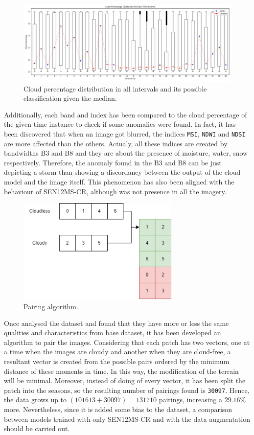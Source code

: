 \begin{figure}[H]
	\centering
	\begin{adjustwidth}{-2cm}{}
		\includegraphics[width=18cm]{imgs/eda/merge/cloud-percentage-each-time-interval}
	\end{adjustwidth}
	\caption{Cloud percentage distribution in all intervals and its possible classification given the median.}
	\label{fig:eda-merge-patch-distribution}
\end{figure}
Additionally, each band and index has been compared to the cloud percentage of the given time instance to check if some anomalies were found. In fact, it has been discovered that when an image got blurred, the indices \texttt{MSI}, \texttt{NDWI} and \texttt{NDSI} are more affected than the others. Actualy, all these indices are created by bandwidths B3 and B8 and they are about the presence of moisture, water, snow respectively. Therefore, the anomaly found in the B3 and B8 can be just depicting a storm than showing a discordancy between the output of the cloud model and the image itself. This phenomenon has also been aligned with the behaviour of SEN12MS-CR, although was not presence in all the imagery.
\begin{figure}[H]
	\centering
	\includegraphics[width=8cm]{imgs/eda/merge/matching}
	\caption{Pairing algorithm.}
	\label{fig:eda-merge-matching}
\end{figure}
Once analysed the dataset and found that they have more or less the same qualities and characteristics from base dataset, it has been developed an algorithm to pair the images. Considering that each patch has two vectors, one at a time when the images are cloudy and another when they are cloud-free, a resultant vector is created from the possible pairs ordered by the minimum distance of these moments in time. In this way, the modification of the terrain will be minimal. Moreover, instead of doing of every vector, it has been split the patch into the seasons, so the resulting number of pairings found is \texttt{30097}. Hence, the data grows up to $(101613 + 30097) = 131710$ pairings, increasing a $29.16 \%$ more. Nevertheless, since it is added some bias to the dataset, a comparison between models trained with only SEN12MS-CR and with the data augmentation should be carried out.
